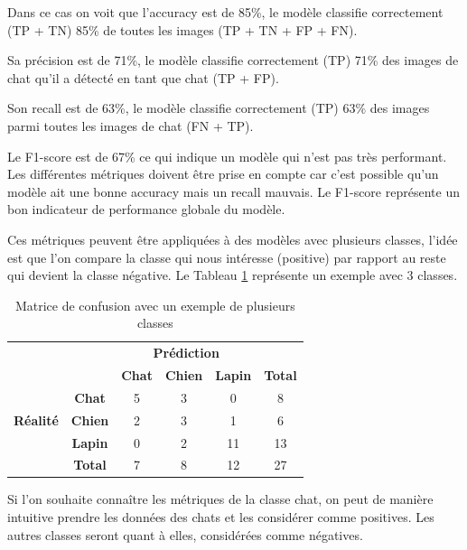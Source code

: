 Dans ce cas on voit que l'accuracy est de 85\%, le modèle classifie correctement (TP + TN) 85\% de toutes les images (TP + TN + FP + FN).

Sa précision est de 71\%, le modèle classifie correctement (TP) 71\% des images de chat qu'il a détecté en tant que chat (TP + FP).

Son recall est de 63\%, le modèle classifie correctement (TP) 63\% des images parmi toutes les images de chat (FN + TP).

Le F1-score est de 67\% ce qui indique un modèle qui n'est pas très performant. Les différentes métriques doivent être prise en compte car c'est possible qu'un modèle ait une bonne accuracy mais un recall mauvais. Le F1-score représente un bon indicateur de performance globale du modèle.

Ces métriques peuvent être appliquées à des modèles avec plusieurs classes, l'idée est que l'on compare la classe qui nous intéresse (positive) par rapport au reste qui devient la classe négative. Le Tableau \ref{tab:matrice_confusion_multiclasse} représente un exemple avec 3 classes.

\begin{table}[H]
    \centering
    \begin{tabular}{|c|c|c|c|c|c|}
    \cline{3-5}
    \multicolumn{1}{c}{} & \multicolumn{1}{c|}{} & \multicolumn{3}{c|}{\textbf{Prédiction}} & \multicolumn{1}{c}{} \\
    \cline{3-6}
    \multicolumn{1}{c}{} & \multicolumn{1}{c|}{} & \textbf{Chat} & \textbf{Chien} & \textbf{Lapin} & \textbf{Total} \\
    \hline
    \multirow{3}{*}{\textbf{Réalité}} & \textbf{Chat} & 5 & 3 & 0 & 8 \\
    \cline{2-6}
    & \textbf{Chien} & 2 & 3 & 1 & 6 \\
    \cline{2-6}
    & \textbf{Lapin} & 0 & 2 & 11 & 13 \\
    \hline
    \multicolumn{1}{c|}{} & \textbf{Total} & 7 & 8 & 12 & 27 \\
    \cline{2-6}
    \end{tabular}
    \caption{Matrice de confusion avec un exemple de plusieurs classes}
    \label{tab:matrice_confusion_multiclasse}
\end{table}

Si l'on souhaite connaître les métriques de la classe chat, on peut de manière intuitive prendre les données des chats et les considérer comme positives. Les autres classes seront quant à elles, considérées comme négatives.

